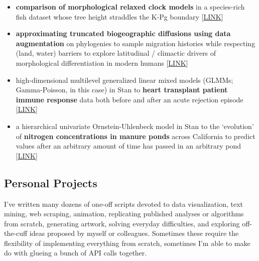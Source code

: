 \documentclass[12pt]{article}
\begin{document}
\begin{itemize}[noitemsep]

\item \textbf{comparison of morphological relaxed clock models} in a species-rich fish dataset whose tree height straddles the K-Pg boundary [\href{https://github.com/NikVetr/dissertation_work/blob/961baf0f64fe6139dc2c1723d37dcd4d51cbd16a/rateHeterogeneity\_DisparityThroughTime.R}{LINK}]
\item \textbf{approximating truncated biogeographic diffusions using data augmentation} on phylogenies to sample migration histories while respecting (land, water) barriers to explore latitudinal / climactic drivers of morphological differentiation in modern humans [\href{https://github.com/NikVetr/dissertation\_work/blob/961baf0f64fe6139dc2c1723d37dcd4d51cbd16a/truncatedBMapprox.R}{LINK}]
\item high-dimensional multilevel generalized linear mixed models (GLMMs; Gamma-Poisson, in this case) in Stan to \textbf{heart transplant patient immune response} data both before and after an acute rejection episode [\href{https://github.com/NikVetr/side\_projects/blob/master/multilevelPoisson.R}{LINK}]
\item a hierarchical univariate Ornstein-Uhlenbeck model in Stan to the `evolution' of \textbf{nitrogen concentrations in manure ponds} across California to predict values after an arbitrary amount of time has passed in an arbitrary pond [\href{https://github.com/NikVetr/side_projects/blob/24f7e38876a95433364123441f9b41d260105be6/OUmodel\_manurePonds.R}{LINK}]

\end{itemize}

%

\subsection{Personal Projects}
I've written many dozens of one-off scripts devoted to data visualization, text mining, web scraping, animation, replicating published analyses or algorithms from scratch, generating artwork, solving everyday difficulties, and exploring off-the-cuff ideas proposed by myself or colleagues. Sometimes these require the flexibility of implementing everything from scratch, sometimes I'm able to make do with glueing a bunch of API calls together.
\end{document}
